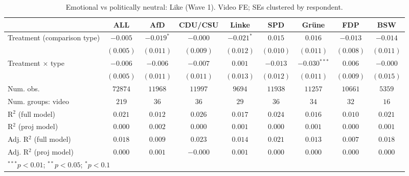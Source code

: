 
\begin{table}
\begin{center}
\begin{tabular}{l c c c c c c c c}
\hline
 & ALL & AfD & CDU/CSU & Linke & SPD & Grüne & FDP & BSW \\
\hline
Treatment (comparison type) & $-0.005$  & $-0.019^{*}$ & $-0.000$  & $-0.021^{*}$ & $0.015$   & $0.016$        & $-0.013$  & $-0.014$  \\
                            & $(0.005)$ & $(0.011)$    & $(0.009)$ & $(0.012)$    & $(0.010)$ & $(0.011)$      & $(0.008)$ & $(0.011)$ \\
Treatment × type            & $-0.006$  & $-0.006$     & $-0.007$  & $0.001$      & $-0.013$  & $-0.030^{***}$ & $0.006$   & $-0.000$  \\
                            & $(0.005)$ & $(0.011)$    & $(0.011)$ & $(0.013)$    & $(0.012)$ & $(0.011)$      & $(0.009)$ & $(0.015)$ \\
\hline
Num. obs.                   & $72874$   & $11968$      & $11997$   & $9694$       & $11938$   & $11257$        & $10661$   & $5359$    \\
Num. groups: video          & $219$     & $36$         & $36$      & $29$         & $36$      & $34$           & $32$      & $16$      \\
R$^2$ (full model)          & $0.021$   & $0.012$      & $0.026$   & $0.017$      & $0.024$   & $0.016$        & $0.010$   & $0.021$   \\
R$^2$ (proj model)          & $0.000$   & $0.002$      & $0.000$   & $0.001$      & $0.000$   & $0.001$        & $0.000$   & $0.001$   \\
Adj. R$^2$ (full model)     & $0.018$   & $0.009$      & $0.023$   & $0.014$      & $0.021$   & $0.013$        & $0.007$   & $0.018$   \\
Adj. R$^2$ (proj model)     & $0.000$   & $0.001$      & $-0.000$  & $0.001$      & $0.000$   & $0.000$        & $0.000$   & $0.000$   \\
\hline
\multicolumn{9}{l}{\scriptsize{$^{***}p<0.01$; $^{**}p<0.05$; $^{*}p<0.1$}}
\end{tabular}
\caption{Emotional vs politically neutral: Like (Wave 1). Video FE; SEs clustered by respondent.}
\label{tab:compare_emotional_vs_neutral_like}
\end{center}
\end{table}
